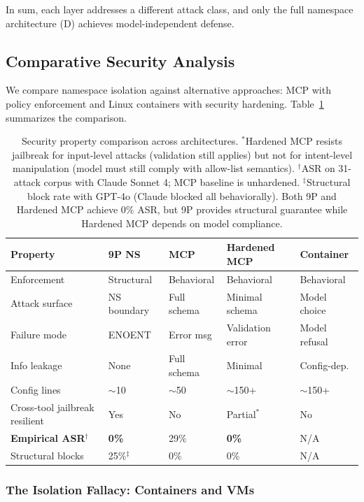 \documentclass[acmsmall,screen,review]{acmart}
\begin{document}
In sum, each layer addresses a different attack class, and only the full namespace architecture (D) achieves model-independent defense.

\subsection{Comparative Security Analysis}

We compare namespace isolation against alternative approaches: MCP with policy enforcement and Linux containers with security hardening. Table~\ref{tab:comparative} summarizes the comparison.

\begin{table}[h]
\centering
\small
\begin{tabular}{p{2.2cm}p{1.5cm}p{1.5cm}p{1.5cm}p{1.5cm}}
\hline
\textbf{Property} & \textbf{9P NS} & \textbf{MCP} & \textbf{Hardened MCP} & \textbf{Container} \\
\hline
Enforcement & Structural & Behavioral & Behavioral & Behavioral \\
Attack surface & NS boundary & Full schema & Minimal schema & Model choice \\
Failure mode & ENOENT & Error msg & Validation error & Model refusal \\
Info leakage & None & Full schema & Minimal & Config-dep. \\
Config lines & $\sim$10 & $\sim$50 & $\sim$150+ & $\sim$150+ \\
Cross-tool jailbreak resilient & Yes & No & Partial$^*$ & No \\
\textbf{Empirical ASR$^\dagger$} & \textbf{0\%} & 29\% & \textbf{0\%} & N/A \\
Structural blocks & 25\%$^\ddagger$ & 0\% & 0\% & N/A \\
\hline
\end{tabular}
\caption{Security property comparison across architectures. $^*$Hardened MCP resists jailbreak for input-level attacks (validation still applies) but not for intent-level manipulation (model must still comply with allow-list semantics). $^\dagger$ASR on 31-attack corpus with Claude Sonnet 4; MCP baseline is unhardened. $^\ddagger$Structural block rate with GPT-4o (Claude blocked all behaviorally). Both 9P and Hardened MCP achieve 0\% ASR, but 9P provides structural guarantee while Hardened MCP depends on model compliance.}
\label{tab:comparative}
\end{table}

\subsubsection{The Isolation Fallacy: Containers and VMs}
\end{document}
